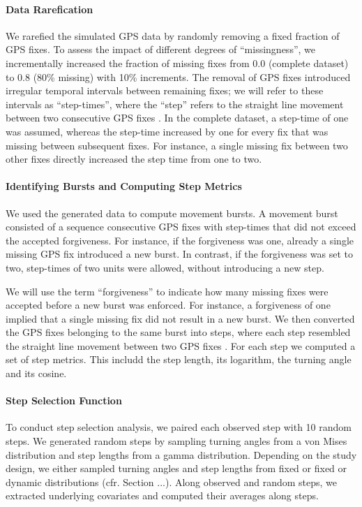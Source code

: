 \documentclass[abstract=on,10pt,a4paper,bibliography=totocnumbered]{article}
\begin{document}
\paragraph{Data Rarefication}
We rarefied the simulated GPS data by randomly removing a fixed fraction of GPS
fixes. To assess the impact of different degrees of  ``missingness'', we
incrementally increased the fraction of missing fixes from 0.0 (complete
dataset) to 0.8 (80\% missing) with 10\% increments. The removal of GPS fixes
introduced irregular temporal intervals between remaining fixes; we will refer
to these intervals as ``step-times'', where the  ``step'' refers to the straight
line movement between two consecutive GPS fixes \citep{Turchin.1998}. In the
complete dataset, a step-time of one was assumed, whereas the step-time
increased by one for every fix that was missing between subsequent fixes. For
instance, a single missing fix between two other fixes directly increased the
step time from one to two.

\paragraph{Identifying Bursts and Computing Step Metrics}
We used the generated data to compute movement bursts. A movement burst
consisted of a sequence consecutive GPS fixes with step-times that did not
exceed the accepted forgiveness. For instance, if the forgiveness was one,
already a single missing GPS fix introduced a new burst. In contrast, if the
forgiveness was set to two, step-times of two units were allowed, without
introducing a new step.

We will use the term  ``forgiveness'' to indicate how many missing fixes were
accepted before a new burst was enforced. For instance, a forgiveness of one
implied that a single missing fix did not result in a new burst. We then
converted the GPS fixes belonging to the same burst into steps, where each step
resembled the straight line movement between two GPS fixes \citep{Turchin.1998}.
For each step we computed a set of step metrics. This includd the step length,
its logarithm, the turning angle and its cosine.

\paragraph{Step Selection Function}
To conduct step selection analysis, we paired each observed step with 10 random
steps. We generated random steps by sampling turning angles from a von Mises
distribution and step lengths from a gamma distribution. Depending on the study
design, we either sampled turning angles and step lengths from fixed or fixed or
dynamic distributions (cfr. Section ...). Along observed and random steps, we
extracted underlying covariates and computed their averages along steps.
\end{document}
